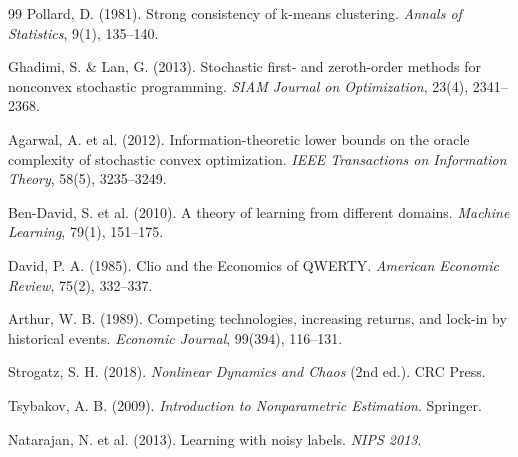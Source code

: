 \documentclass[11pt,a4paper]{article}
\theoremstyle{plain}
\theoremstyle{definition}
\theoremstyle{remark}
\begin{document}
\begin{thebibliography}{99}
Pollard, D. (1981).
Strong consistency of k-means clustering.
\emph{Annals of Statistics}, 9(1), 135--140.

Ghadimi, S. \& Lan, G. (2013).
Stochastic first- and zeroth-order methods for nonconvex stochastic programming.
\emph{SIAM Journal on Optimization}, 23(4), 2341--2368.

Agarwal, A. et al. (2012).
Information-theoretic lower bounds on the oracle complexity of stochastic convex optimization.
\emph{IEEE Transactions on Information Theory}, 58(5), 3235--3249.

Ben-David, S. et al. (2010).
A theory of learning from different domains.
\emph{Machine Learning}, 79(1), 151--175.

David, P. A. (1985).
Clio and the Economics of QWERTY.
\emph{American Economic Review}, 75(2), 332--337.

Arthur, W. B. (1989).
Competing technologies, increasing returns, and lock-in by historical events.
\emph{Economic Journal}, 99(394), 116--131.

Strogatz, S. H. (2018).
\emph{Nonlinear Dynamics and Chaos} (2nd ed.). CRC Press.

Tsybakov, A. B. (2009).
\emph{Introduction to Nonparametric Estimation}. Springer.

Natarajan, N. et al. (2013).
Learning with noisy labels.
\emph{NIPS 2013}.

\end{thebibliography}
\end{document}
